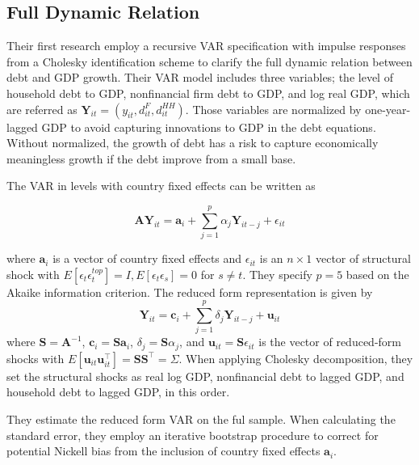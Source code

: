 \documentclass{ltjarticle}
\begin{document}
\subsection{Full Dynamic Relation}
Their first research employ a recursive VAR specification with impulse responses from a Cholesky identification scheme to clarify the full dynamic relation between debt and GDP growth. Their VAR model includes three variables; the level of household debt to GDP, nonfinancial firm debt to GDP, and log real GDP, which are referred as $\mathbf{Y}_{it}=(y_{it},d_{it}^{F},d_{it}^{HH}) $. Those variables are normalized by one-year-lagged GDP to avoid capturing innovations to GDP in the debt equations. Without normalized, the growth of debt has a risk to capture economically meaningless growth if the debt improve from a small base.

The VAR in levels with country fixed effects can be written as

\begin{equation*}
    \mathbf{AY}_{it}=\mathbf{a}_{i}+\sum_{j=1}^{p}\alpha_{j}\mathbf{Y}_{it-j}+\epsilon_{it}\nonumber
\end{equation*}

where $\mathbf{a}_{i}$ is a vector of country fixed effects and $\epsilon_{it}$ is an $n\times1$ vector of structural shock with $E[\epsilon_{t}\epsilon_{t}^{top}]=I, E[\epsilon_{t}\epsilon_{s}]=0 $ for $s\ne t$. They specify $p=5$ based on the Akaike information criterion.
The reduced form representation is given by
\begin{equation}
    \label{eq1}
    \mathbf{Y}_{it}=\mathbf{c}_{i}+\sum_{j=1}^{p}\delta_{j}\mathbf{Y}_{it-j}+\mathbf{u}_{it}
\end{equation}
where $\mathbf{S}=\mathbf{A}^{-1}$, $\mathbf{c}_{i}=\mathbf{S}\mathbf{a}_{i} $, $\delta_{j}=\mathbf{S}\alpha_{j} $, and $\mathbf{u}_{it}=\mathbf{S}\epsilon_{it} $ is the vector of reduced-form shocks with $E[\mathbf{u}_{it}\mathbf{u}_{it}^{\top}]=\mathbf{S}\mathbf{S}^{\top}=\Sigma $. When applying Cholesky decomposition, they set the structural shocks as real log GDP, nonfinancial debt to lagged GDP, and household debt to lagged GDP, in this order.

They estimate the reduced form VAR on the ful sample. When calculating the standard error, they employ an iterative bootstrap procedure to correct for potential Nickell bias from the inclusion of country fixed effects $\mathbf{a}_{i}$.
\end{document}
